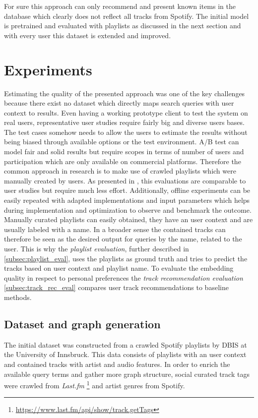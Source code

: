 \documentclass[sigconf]{acmart}
\begin{document}
For sure this approach can only recommend and present known items in the database which clearly does not reflect all tracks from Spotify. The initial model is pretrained and evaluated with playlists as discussed in the next section and with every user this dataset is extended and improved.

\section{Experiments}
Estimating the quality of the presented approach was one of the key challenges because there exist no dataset which directly maps search queries with user context to results. Even having a working prototype client to test the system on real users, representative user studies require fairly big and diverse users bases. The test cases somehow needs to allow the users to estimate the results without being biased through available options or the test environment. A/B test can model fair and solid results but require scopes in terms of number of users and participation which are only available on commercial platforms. Therefore the common approach in research is to make use of crawled playlists which were manually created by users. As presented in \cite{kamehkhosh2017user}, this evaluations are comparable to user studies but require much less effort. Additionally, offline experiments can be easily repeated with adapted implementations and input parameters which helps during implementation and optimization to observe and benchmark the outcome. \\

Manually curated playlists can easily obtained, they have an user context and are usually labeled with a name. In a broader sense the contained tracks can therefore be seen as the desired output for queries by the name, related to the user. This is why the \emph{playlist evaluation}, further described in \ref{subsec:playlist_eval}, uses the playlists as ground truth and tries to predict the tracks based on user context and playlist name. To evaluate the embedding quality in respect to personal preferences the \emph{track recommendation evaluation} \ref{subsec:track_rec_eval} compares user track recommendations to baseline methods.


\subsection{Dataset and graph generation}
The initial dataset was constructed from a crawled Spotify playlists by DBIS at the University of Innsbruck\cite{pichl2017improving}. This data consists of playlists with an user context and contained tracks with artist and audio features. In order to enrich the available query terms and gather more graph structure, social curated track tags were crawled from \emph{Last.fm} \footnote{\url{https://www.last.fm/api/show/track.getTags}} and artist genres from Spotify.
\end{document}
